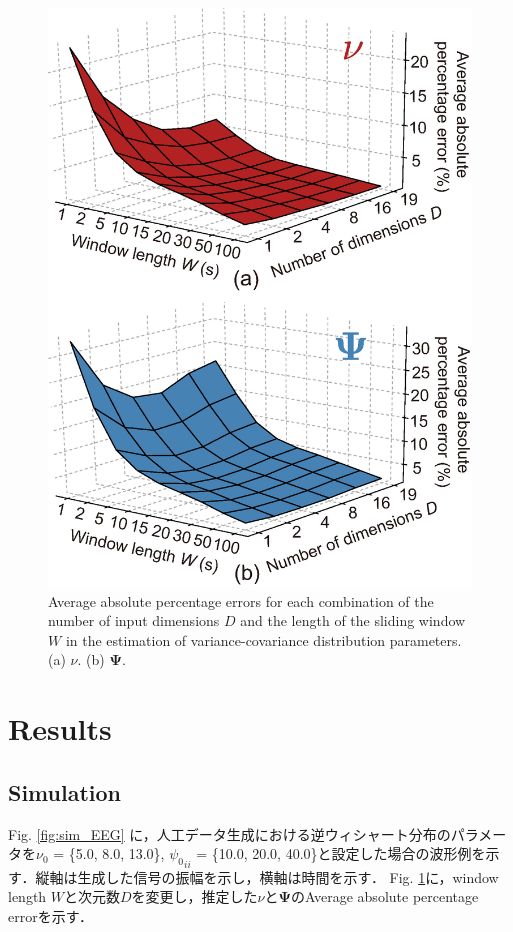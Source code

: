 \documentclass[journal]{IEEEtran}
\begin{document}
\begin{figure}[!t]
\centering
\includegraphics[width=0.9\hsize]{figure/AAPE_color_dim_fro_time.eps}
\caption{Average absolute percentage errors for each combination of the number of input dimensions $D$ and the length of the sliding window $W$ in the estimation of variance-covariance distribution parameters. (a) $\nu$. (b) $\mathbf{\Psi}$.}
\label{fig:ES_param}
\end{figure}

\section{Results}
\subsection{Simulation}
Fig. \ref{fig:sim_EEG} に，人工データ生成における逆ウィシャート分布のパラメータを$\nu_0$ = \{5.0, 8.0, 13.0\}, ${\psi_0}_{ii}$ = \{10.0, 20.0, 40.0\}と設定した場合の波形例を示す．縦軸は生成した信号の振幅を示し，横軸は時間を示す．
Fig. \ref{fig:ES_param}に，window length $W$と次元数$D$を変更し，推定した$\nu$と$\mathbf{\Psi}$のAverage absolute percentage errorを示す．
\end{document}
